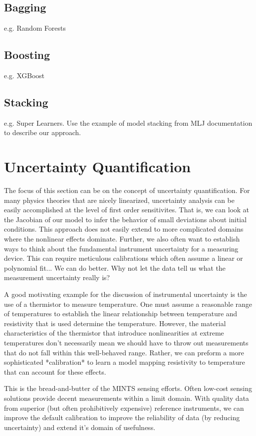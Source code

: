 \subsection{Bagging}
e.g. Random Forests
\subsection{Boosting}
e.g. XGBoost
\subsection{Stacking}
e.g. Super Learners. Use the example of model stacking from MLJ documentation to describe our approach.




\section{Uncertainty Quantification}
The focus of this section can be on the concept of uncertainty quantification. For many physics theories that are nicely linearized, uncertainty analysis can be easily accomplished at the level of first order sensitivites. That is, we can look at the Jacobian of our model to infer the behavior of small deviations about initial conditions. This approach does not easily extend to more complicated domains where the nonlinear effects dominate. Further, we also often want to establish ways to think about the fundamental instrument uncertainty for a measuring device. This can require meticulous calibrations which often assume a linear or polynomial fit... We can do better. Why not let the data tell us what the measurement uncertainty really is?

A good motivating example for the discussion of instrumental uncertainty is the use of a thermistor to measure temperature. One must assume a reasonable range of temperatures to establish the linear relationship between temperature and resistivity that is used determine the temperature. However, the material characteristics of the thermistor that introduce nonlinearities at extreme temperatures don't necessarily mean we should have to throw out measurements that do not fall within this well-behaved range. Rather, we can preform a more sophisticated *calibration* to learn a model mapping resistivity to temperature that can account for these effects.

This is the bread-and-butter of the MINTS sensing efforts. Often low-cost sensing solutions provide decent measurements within a limit domain. With quality data from superior (but often prohibitively expensive) reference instruments, we can improve the default calibration to improve the reliability of data (by reducing uncertainty) and extend it's domain of usefulness.

